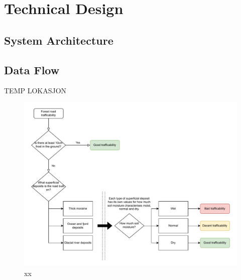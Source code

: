 \chapter{Technical Design}

\section{System Architecture}\label{sec:systemarchitecture}

\section{Data Flow} %

TEMP LOKASJON

\begin{figure}[h]
    \centering
    \includegraphics[width=1\linewidth]{figures/roadclassification.pdf}
    \caption[Diagram visualizing the forest road classification.]{xx}
    \label{fig:forestroadclassification}
\end{figure}

